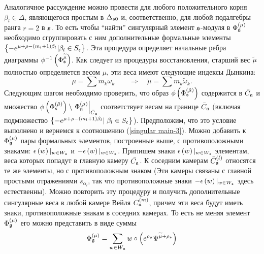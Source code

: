 Аналогичное рассуждение  можно провести для любого положительного корня $\beta _{l}\in \Delta $, являющегося простым в $\Delta _{\mathfrak{s}0}$ и, соответственно, для любой подалгебры ранга $r=2$ в $\mathfrak{s}$. То есть чтобы ``найти'' сингулярный элемент $\mathfrak{s}$-модуля в $\Phi_{\mathfrak{g}}^{\left( \mu \right) }$ необходимо сгруппировать с ним дополнительные формальные элементы  $\left\{ -e^{\mu +\rho-\left( m_{l}+1\right) \beta _{l}}|\beta _{l}\in S_{\frak{c}}\right\}.$ Эта процедура определяет начальные ребра диаграммы $\phi ^{-1}\left( \Phi _{\mathfrak{s}}^{\widetilde{\mu }}\right) $. Как следует из процедуры восстановления, старший вес $\widetilde{\mu }$ полностью определяется весом $\mu $, эти веса имеют следующие индексы Дынкина:
\begin{equation}
\mu =\sum m_{k}\omega _{k}\qquad \Longrightarrow \quad \widetilde{\mu }=\sum
m_{k}\widetilde{\omega }_{k} . \label{new h weight}
\end{equation}
Следующим шагом необходимо проверить, что образ $\phi\left(\Phi^{(\tilde \mu)}_{\mathfrak{s}}\right)$ содержится в $\bar C_{\mathfrak{a}}$ и множество $\phi\left(\Phi^{(\tilde\mu)}_{\mathfrak{s}}\right)\setminus \left.\Phi^{(\mu)}_{\mathfrak{g}}\right|_{\bar C_{\mathfrak{a}}}$ соответствует весам на границе $\bar C_{\mathfrak{a}}$ (включая подмножество $\left\{-e^{\mu+\rho-(m_l+1)\beta_l}|\; \beta_l\in S_{\frak{c}}\right\}$). Предположим, что это условие выполнено и вернемся к соотношению (\ref{singular main-3}). Можно добавить к $\Phi _{\mathfrak{g}}^{\left( \mu \right) }$ пары формальных элементов, построенные выше, с противоположными знаками: $\epsilon \left( w\right)|_{w\in W_{\mathfrak{s}}}$  и  $-\epsilon \left( w\right) |_{w\in W_{\mathfrak{s}}}$. 
Припишем знаки $\epsilon \left( w\right) |_{w\in W_{\mathfrak{s}}}$ элементам, веса которых попадут в главную камеру $\bar{C_{\mathfrak{a}}}$. К соседним камерам $\bar{C}_{\mathfrak{a}}^{(l)}$ относятся те же элементы, но  с противоположным знаком  (Эти камеры связаны с главной простыми отражениями $s_{\alpha _{l}}$, так что противоположные знаки $-\epsilon \left( w\right) |_{w\in W_{\mathfrak{s}}}$ здесь естественны). Можно повторить эту процедуру и получить дополнительные сингулярные веса в любой камере Вейля $\bar{C_{\mathfrak{a}}^{(m)}}$, причем эти веса будут иметь знаки, противоположные знакам в соседних камерах. То есть не меняя элемент $\Phi _{\mathfrak{g}}^{\left( \mu \right) }$ его можно представить в виде суммы
\begin{equation}
\Phi _{\mathfrak{g}}^{\left( \mu \right) }=\sum_{w\in W_{\mathfrak{a}}}w\circ \left(
e^{\rho _{\mathfrak{a}}}\Psi ^{\widetilde{\mu }+\rho _{\mathfrak{s}}}\right)
\label{singular final}
\end{equation}
